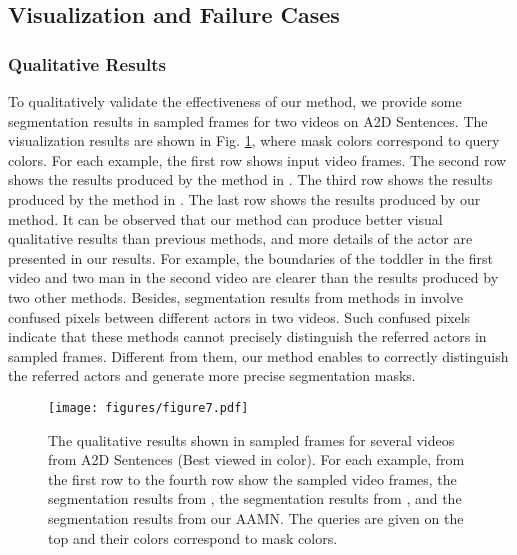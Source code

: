 \documentclass[journal]{IEEEtran}
\begin{document}
\vspace{-0.5cm}
\subsection{Visualization and Failure Cases}
\subsubsection{Qualitative Results}
To qualitatively validate the effectiveness of our method, we provide some segmentation results in sampled frames for two videos on A2D Sentences. The visualization results are shown in Fig. \ref{fig:visualization}, where mask colors correspond to query colors. For each example, the first row shows input video frames. The second row shows the results produced by the method in \cite{gavrilyuk2018actor}. The third row shows the results produced by the method in \cite{wang2019asymmetric}. The last row shows the results produced by our method. It can be observed that our method can produce better visual qualitative results than previous methods, and more details of the actor are presented in our results. For example, the boundaries of the toddler in the first video and two man in the second video are clearer than the results produced by two other methods. Besides, segmentation results from methods in \cite{gavrilyuk2018actor, wang2019asymmetric} involve confused pixels between different actors in two videos. Such confused pixels indicate that these methods cannot precisely distinguish the referred actors in sampled frames. Different from them, our method enables to correctly distinguish the referred actors and generate more precise segmentation masks.

\begin{figure}[!tb]
\centering
\texttt{[image: figures/figure7.pdf]}
\caption{The qualitative results shown in sampled frames for several videos from A2D Sentences (Best viewed in color). For each example, from the first row to the fourth row show the sampled video frames, the segmentation results from \cite{gavrilyuk2018actor}, the segmentation results from \cite{wang2019asymmetric}, and the segmentation results from our AAMN. The queries are given on the top and their colors correspond to mask colors.}
\label{fig:visualization}
\vspace{-0.4cm}
\end{figure}
\end{document}
